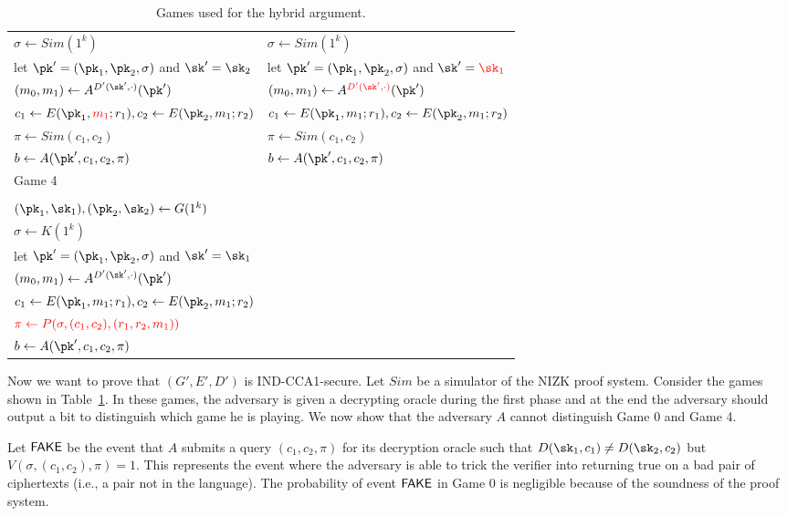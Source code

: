 \documentclass[12pt]{tufte-book}
\begin{document}
\begin{table}[t!]
\begin{tabular}{l|l}
$\sigma \leftarrow {Sim(1^k)}$ &
$\sigma \leftarrow {Sim(1^k)}$ \\
let $\pk'=(\pk_1,\pk_2,\sigma)$ and $\sk'={\sk_2}$  &
let $\pk'=(\pk_1,\pk_2,\sigma)$ and $\sk'=\textcolor{red}{\sk_1}$  \\
$(m_0,m_1) \leftarrow A^{D'(\sk',\cdot)}(\pk')$ &
$(m_0,m_1) \leftarrow A^{\textcolor{red}{D'(\sk',\cdot)}}(\pk')$ \\
$c_1 \leftarrow E(\pk_1,\textcolor{red}{m_1};r_1), c_2 \leftarrow E(\pk_2,{m_1};r_2)$ &
$c_1 \leftarrow E(\pk_1,{m_1};r_1), c_2 \leftarrow E(\pk_2,{m_1};r_2)$ \\
$\pi \leftarrow {Sim(c_1,c_2)}$ &
$\pi \leftarrow {Sim(c_1,c_2)}$ \\
$b \leftarrow A(\pk',c_1,c_2,\pi)$ &
$b \leftarrow A(\pk',c_1,c_2,\pi)$ \\
\hline
Game 4 & \\
 & \\
$(\pk_1,\sk_1),(\pk_2,\sk_2) \leftarrow G(1^k)$ & \\
$\sigma \leftarrow {K(1^k)}$ & \\
let $\pk'=(\pk_1,\pk_2,\sigma)$ and $\sk'={\sk_1}$  & \\
$(m_0,m_1) \leftarrow A^{D'(\sk',\cdot)}(\pk')$ & \\
$c_1 \leftarrow E(\pk_1,{m_1};r_1), c_2 \leftarrow E(\pk_2,{m_1};r_2)$ & \\
$\textcolor{red}{\pi \leftarrow {P(\sigma,(c_1,c_2),(r_1,r_2,{m_1}))}}$ & \\
$b \leftarrow A(\pk',c_1,c_2,\pi)$ & \\
\end{tabular}
\caption{Games used for the hybrid argument.}\label{tab:games}
\end{table}

Now we want to prove that $(G',E',D')$ is IND-CCA1-secure.
Let $Sim$ be a simulator of the NIZK proof system.
Consider the games shown in Table~\ref{tab:games}.
In these games, the adversary is given a decrypting oracle during the first phase
and at the end the adversary should output a bit to distinguish which game he is playing.
We now show that the adversary $A$ cannot distinguish Game 0 and Game 4.

Let $\mathsf{FAKE}$  be the event that $A$ submits a query $(c_1,c_2,\pi)$ for its decryption oracle such that $D(\sk_1,c_1) \neq D(\sk_2, c_2)$ but $V(\sigma,(c_1,c_2),\pi)=1$.
This represents the event where the adversary is able to trick the verifier into returning true on a bad pair of ciphertexts (i.e., a pair not in the language).
The probability of event $\mathsf{FAKE}$ in Game 0 is negligible because of the
soundness of the proof system.
\end{document}
